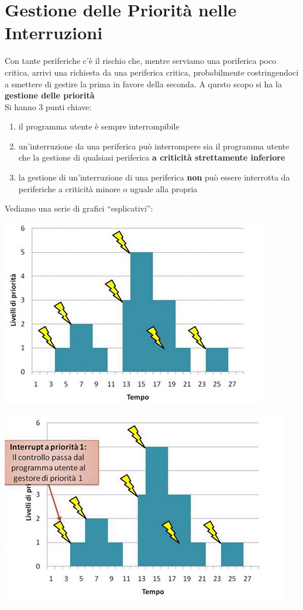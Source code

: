 \documentclass[a4paper,12pt, oneside]{book}
\begin{document}
\section{Gestione delle Priorità nelle Interruzioni}
Con tante periferiche c'è il rischio che, mentre serviamo una
poriferica poco critica, arrivi una richiesta da una periferica
critica, probabilmente costringendoci a smettere di gestire la prima
in favore della seconda. A qursto scopo si ha la \textbf{gestione
  delle priorità}\\
Si hanno 3 punti chiave:
\begin{enumerate}
  \item il programma utente è sempre interrompibile
  \item un'interruzione da una periferica può interrompere sia il
  programma utente che la gestione di qualsiasi periferica \textbf{a
    criticità strettamente inferiore}
  \item la gestione di un'interruzione di una periferica \textbf{non}
  può essere interrotta da periferiche a criticità minore o uguale
  alla propria
\end{enumerate}
Vediamo una serie di grafici ``esplicativi'':
\begin{center}
  \includegraphics[scale = 0.6]{img/int.png}
\end{center}
\begin{center}
  \includegraphics[scale = 0.6]{img/int2.png}
\end{center}
\end{document}
